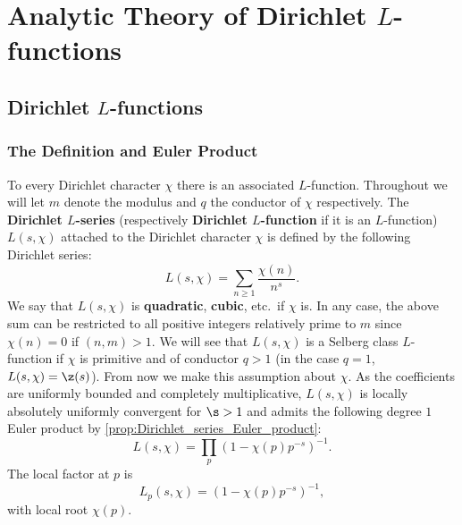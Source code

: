 \chapter{Analytic Theory of Dirichlet \texorpdfstring{\(L\)}{L}-functions}
  \section{Dirichlet \texorpdfstring{\(L\)}{L}-functions}
    \subsection*{The Definition and Euler Product}
      To every Dirichlet character \(\chi\) there is an associated \(L\)-function. Throughout we will let \(m\) denote the modulus and \(q\) the conductor of \(\chi\) respectively. The \textbf{Dirichlet \(L\)-series} (respectively \textbf{Dirichlet \(L\)-function} if it is an \(L\)-function) \(L(s,\chi)\) attached to the Dirichlet character \(\chi\) is defined by the following Dirichlet series:
      \[
        L(s,\chi) = \sum_{n \ge 1}\frac{\chi(n)}{n^{s}}.
      \]
      We say that \(L(s,\chi)\) is \textbf{quadratic}, \textbf{cubic}, etc.\ if \(\chi\) is. In any case, the above sum can be restricted to all positive integers relatively prime to \(m\) since \(\chi(n) = 0\) if \((n,m) > 1\). We will see that \(L(s,\chi)\) is a Selberg class \(L\)-function if \(\chi\) is primitive and of conductor \(q > 1\) (in the case \(q = 1\), \(L(s,\chi) = \z(s)\)). From now we make this assumption about \(\chi\). As the coefficients are uniformly bounded and completely multiplicative, \(L(s,\chi)\) is locally absolutely uniformly convergent for \(\s > 1\) and admits the following degree \(1\) Euler product by \cref{prop:Dirichlet_series_Euler_product}:
      \[
        L(s,\chi) = \prod_{p}(1-\chi(p)p^{-s})^{-1}.
      \]
      The local factor at \(p\) is
      \[
        L_{p}(s,\chi) = (1-\chi(p)p^{-s})^{-1},
      \]
      with local root \(\chi(p)\).
